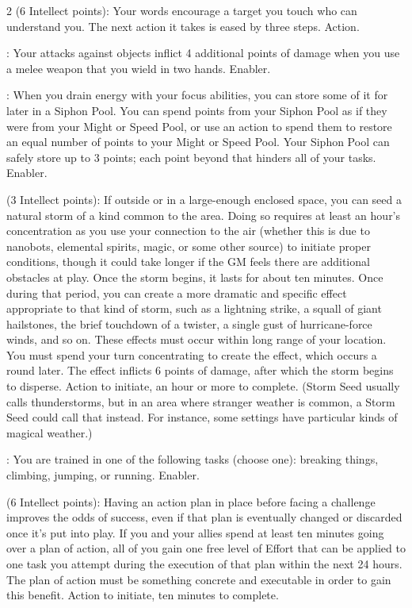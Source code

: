 \begin{multicols}{2}
 (6 Intellect points): Your words encourage a target you touch who can understand you. The next action it takes is eased by three steps. Action. 
 
: Your attacks against objects inflict 4 additional points of damage when you use a melee weapon that you wield in two hands. Enabler. 
 
: When you drain energy with your focus abilities, you can store some of it for later in a Siphon Pool. You can spend points from your Siphon Pool as if they were from your Might or Speed Pool, or use an action to spend them to restore an equal number of points to your Might or Speed Pool. Your Siphon Pool can safely store up to 3 points; each point beyond that hinders all of your tasks. Enabler. 
 
 (3 Intellect points): If outside or in a large-enough enclosed space, you can seed a natural storm of a kind common to the area. Doing so requires at least an hour’s concentration as you use your connection to the air (whether this is due to nanobots, elemental spirits, magic, or some other source) to initiate proper conditions, though it could take longer if the GM feels there are additional obstacles at play. Once the storm begins, it lasts for about ten minutes. Once during that period, you can create a more dramatic and specific effect appropriate to that kind of storm, such as a lightning strike, a squall of giant hailstones, the brief touchdown of a twister, a single gust of hurricane-force winds, and so on. These effects must occur within long range of your location. You must spend your turn concentrating to create the effect, which occurs a round later. The effect inflicts 6 points of damage, after which the storm begins to disperse. Action to initiate, an hour or more to complete. (Storm Seed usually calls thunderstorms, but in an area where stranger weather is common, a Storm Seed could call that instead. For instance, some settings have particular kinds of magical weather.)
 
: You are trained in one of the following tasks (choose one): breaking things, climbing, jumping, or running. Enabler.
 
 (6 Intellect points): Having an action plan in place before facing a challenge improves the odds of success, even if that plan is eventually changed or discarded once it’s put into play. If you and your allies spend at least ten minutes going over a plan of action, all of you gain one free level of Effort that can be applied to one task you attempt during the execution of that plan within the next 24 hours. The plan of action must be something concrete and executable in order to gain this benefit. Action to initiate, ten minutes to complete.
 

\end{multicols}
